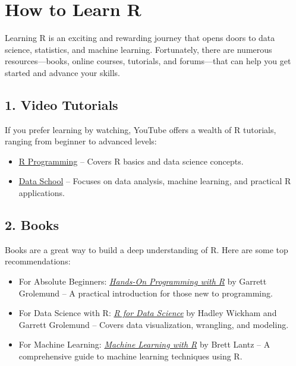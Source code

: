\documentclass[
]{book}
\providecommand{\tightlist}{%
  \setlength{\itemsep}{0pt}\setlength{\parskip}{0pt}}
\theoremstyle{definition}
\theoremstyle{definition}
\theoremstyle{definition}
\theoremstyle{definition}
\theoremstyle{remark}
\begin{document}
\section{How to Learn R}\label{how-to-learn-r}

Learning R is an exciting and rewarding journey that opens doors to data science, statistics, and machine learning. Fortunately, there are numerous resources---books, online courses, tutorials, and forums---that can help you get started and advance your skills.

\subsection*{1. Video Tutorials}\label{video-tutorials}

If you prefer learning by watching, YouTube offers a wealth of R tutorials, ranging from beginner to advanced levels:

\begin{itemize}
\tightlist
\item
  \href{https://www.youtube.com/channel/UCJ7w9dVjTOJi8Z7j0y9v6Qw}{R Programming} -- Covers R basics and data science concepts.\\
\item
  \href{https://www.youtube.com/user/dataschool}{Data School} -- Focuses on data analysis, machine learning, and practical R applications.
\end{itemize}

\subsection*{2. Books}\label{books}

Books are a great way to build a deep understanding of R. Here are some top recommendations:

\begin{itemize}
\tightlist
\item
  For Absolute Beginners: \href{https://rstudio-education.github.io/hopr/}{\emph{Hands-On Programming with R}} by Garrett Grolemund\citep{grolemund2014hands} -- A practical introduction for those new to programming.\\
\item
  For Data Science with R: \href{https://r4ds.had.co.nz}{\emph{R for Data Science}} by Hadley Wickham and Garrett Grolemund \citep{wickham2017r} -- Covers data visualization, wrangling, and modeling.\\
\item
  For Machine Learning: \href{https://www.packtpub.com/product/machine-learning-with-r/9781782162148}{\emph{Machine Learning with R}} by Brett Lantz\citep{lantz2013machine} -- A comprehensive guide to machine learning techniques using R.
\end{itemize}
\end{document}
